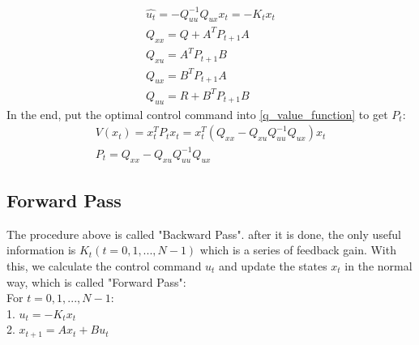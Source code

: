 \documentclass{article}
\begin{document}
\begin{gather}
    \hat{u_t} = -Q_{uu}^{{-1}}Q_{ux} x_t = -K_t x_t\\
    Q_{xx} = Q+A^T P_{t+1} A\\
    Q_{xu} = A^T P_{t+1} B\\
    Q_{ux} = B^T P_{t+1} A\\
    Q_{uu} = R + B^T P_{t+1} B
\end{gather}
In the end, put the optimal control command into \eqref{q_value_function} to get $P_t$:
\begin{gather}
    V(x_t) = x_t^T P_t x_t = x_t^T(Q_{xx} - Q_{xu}Q_{uu}^{-1}Q_{ux})x_t\\
    P_t = Q_{xx} - Q_{xu}Q_{uu}^{-1}Q_{ux}
\end{gather}

\subsection{Forward Pass}
The procedure above is called "Backward Pass". after it is done, the only useful information is $K_t(t=0,1,...,N-1)$ which is a series of feedback gain. With this, we calculate the control command $u_t$ and update the states $x_t$ in the normal way, which is called "Forward Pass":\\
For $t=0,1,...,N-1$:\\
1. $u_t=-K_t x_t$\\
2. $x_{t+1} = A x_t + B u_t$\\
\end{document}

